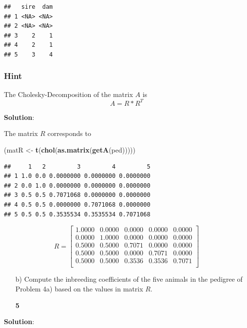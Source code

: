 \documentclass[]{article}
\newenvironment{Shaded}{\begin{snugshade}}{\end{snugshade}}
\newcommand{\KeywordTok}[1]{\textcolor[rgb]{0.13,0.29,0.53}{\textbf{#1}}}
\newcommand{\StringTok}[1]{\textcolor[rgb]{0.31,0.60,0.02}{#1}}
\newcommand{\NormalTok}[1]{#1}
\newcommand{\points}[1]
{\begin{flushright}\textbf{#1}\end{flushright}}
\newcommand{\sol}
{\vspace{2ex}\textbf{Solution}:}
\begin{document}
\begin{verbatim}
##   sire  dam
## 1 <NA> <NA>
## 2 <NA> <NA>
## 3    2    1
## 4    2    1
## 5    3    4
\end{verbatim}

\subsubsection{Hint}\label{hint}

The Cholesky-Decomposition of the matrix \(A\) is \[A = R*R^T\]

\sol

The matrix \(R\) corresponds to

\begin{Shaded}
\begin{Highlighting}[]
\NormalTok{(matR <-}\StringTok{ }\KeywordTok{t}\NormalTok{(}\KeywordTok{chol}\NormalTok{(}\KeywordTok{as.matrix}\NormalTok{(}\KeywordTok{getA}\NormalTok{(ped)))))}
\end{Highlighting}
\end{Shaded}

\begin{verbatim}
##     1   2         3         4         5
## 1 1.0 0.0 0.0000000 0.0000000 0.0000000
## 2 0.0 1.0 0.0000000 0.0000000 0.0000000
## 3 0.5 0.5 0.7071068 0.0000000 0.0000000
## 4 0.5 0.5 0.0000000 0.7071068 0.0000000
## 5 0.5 0.5 0.3535534 0.3535534 0.7071068
\end{verbatim}

\[R = \left[
\begin{array}{rrrrr}
  1.0000 & 0.0000 & 0.0000 & 0.0000 & 0.0000 \\ 
  0.0000 & 1.0000 & 0.0000 & 0.0000 & 0.0000 \\ 
  0.5000 & 0.5000 & 0.7071 & 0.0000 & 0.0000 \\ 
  0.5000 & 0.5000 & 0.0000 & 0.7071 & 0.0000 \\ 
  0.5000 & 0.5000 & 0.3536 & 0.3536 & 0.7071 \\ 
  \end{array}\right]
\]

\clearpage
\pagebreak

\begin{enumerate}
\item[b)] Compute the inbreeding coefficients of the five animals in the pedigree of Problem  4a) based on the values in matrix $R$. 
\points{5}
\end{enumerate}

\sol
\end{document}
